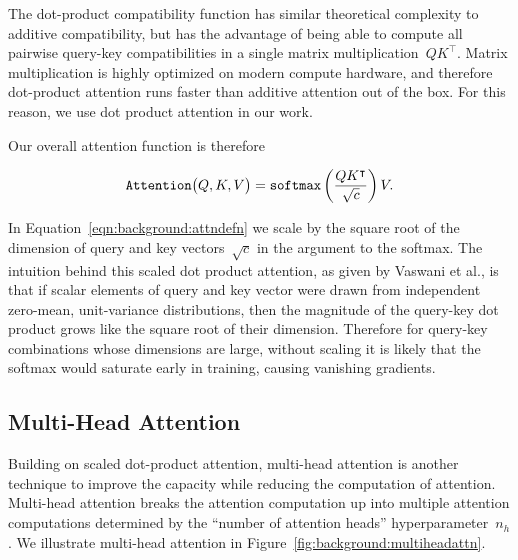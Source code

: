 The dot-product compatibility function has similar theoretical complexity to
additive compatibility, but has the advantage of being able to compute all
pairwise query-key compatibilities in a single matrix
multiplication~$QK^\intercal$.
Matrix multiplication is highly optimized on modern compute hardware, and
therefore dot-product attention runs faster than additive attention out of the
box.
For this reason, we use dot product attention in our work.

Our overall attention function is therefore

\begin{equation}
\mathtt{Attention}\big(Q, K, V\big) = \mathtt{softmax}{}\left(\frac{QK^\intercal}{\sqrt{c}}\right) V.
\label{eqn:background:attndefn}
\end{equation}

In Equation~\ref{eqn:background:attndefn} we scale by the square root of the
dimension of query and key vectors~$\sqrt{c}$ in the argument to the softmax.
The intuition behind this scaled dot product attention, as given by Vaswani et
al., is that if scalar elements of query and key vector were drawn from
independent zero-mean, unit-variance distributions, then the magnitude of the
query-key dot product grows like the square root of their dimension.
Therefore for query-key combinations whose dimensions are large, without
scaling it is likely that the softmax would saturate early in training, causing
vanishing gradients.


\subsection{Multi-Head Attention}

Building on scaled dot-product attention, multi-head attention is another
technique to improve the capacity while reducing the computation of attention.
Multi-head attention breaks the attention computation up into multiple
attention computations determined by the ``number of attention heads''
hyperparameter~$n_h$.
We illustrate multi-head attention in Figure~\ref{fig:background:multiheadattn}.

